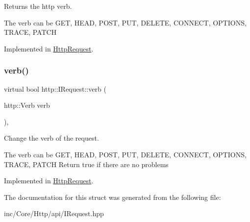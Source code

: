 Returns the http verb. 

The verb can be G\+ET, H\+E\+AD, P\+O\+ST, P\+UT, D\+E\+L\+E\+TE, C\+O\+N\+N\+E\+CT, O\+P\+T\+I\+O\+NS, T\+R\+A\+CE, P\+A\+T\+CH 

Implemented in \hyperlink{classHttpRequest_aded380ba96f29fb1cc6da1679a975dd8}{Http\+Request}.

\mbox{\label{structhttp_1_1IRequest_abcb6f9f77b7d800677e9af3728500fa8}} 
\subsubsection{\texorpdfstring{verb()}{verb()}\hspace{0.1cm}{\footnotesize\ttfamily [2/2]}}
{\footnotesize\ttfamily virtual bool http\+::\+I\+Request\+::verb (\begin{DoxyParamCaption}\item[{http\+::\+Verb}]{verb }\end{DoxyParamCaption})\hspace{0.3cm}{\ttfamily [pure virtual]}, {\ttfamily [noexcept]}}



Change the verb of the request. 

The verb can be G\+ET, H\+E\+AD, P\+O\+ST, P\+UT, D\+E\+L\+E\+TE, C\+O\+N\+N\+E\+CT, O\+P\+T\+I\+O\+NS, T\+R\+A\+CE, P\+A\+T\+CH Return true if there are no problems 

Implemented in \hyperlink{classHttpRequest_a243897d5dd8ba0195ce0acb6e9dd79ae}{Http\+Request}.



The documentation for this struct was generated from the following file\+:\begin{DoxyCompactItemize}
\item 
inc/\+Core/\+Http/api/I\+Request.\+hpp\end{DoxyCompactItemize}
